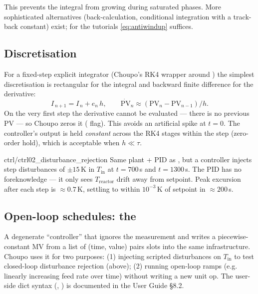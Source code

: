 \documentclass[11pt,a4paper]{article}
\begin{document}
This prevents the integral from growing during saturated phases.
More sophisticated alternatives (back-calculation, conditional
integration with a track-back constant) exist; for the tutorials \eqref{eq:antiwindup} suffices.

\subsection*{Discretisation}

For a fixed-step explicit integrator (Choupo's RK4 wrapper around
) the simplest discretisation is rectangular for
the integral and backward finite difference for the derivative:
\[
    I_{\,n+1} = I_{\,n} + e_n\,h,
    \qquad
    \dot{\mathrm{PV}}_n \approx (\mathrm{PV}_n - \mathrm{PV}_{n-1}) / h.
\]
On the very first step the derivative cannot be evaluated --- there
is no previous PV --- so Choupo zeros it ( flag).
This avoids an artificial spike at $t = 0$.  The controller's
output is held \emph{constant} across the RK4 stages within the
step (zero-order hold), which is acceptable when $h \ll \tau$.

\begin{tutoriallink}{ctrl/ctrl02\_disturbance\_rejection}
Same plant + PID as , but a  controller
injects step disturbances of $\pm 15$\,K in $T_{\mathrm{in}}$ at
$t = 700$\,s and $t = 1300$\,s.  The PID has no foreknowledge ---
it only sees $T_{\mathrm{reactor}}$ drift away from setpoint.  Peak
excursion after each step is $\approx 0.7$\,K, settling to within
$10^{-3}$\,K of setpoint in $\approx 200$\,s.
\end{tutoriallink}

\subsection*{Open-loop schedules: the }

A degenerate ``controller'' that ignores the measurement and
writes a piecewise-constant MV from a list of (time, value) pairs
slots into the same  infrastructure.  Choupo uses
it for two purposes: (1) injecting scripted disturbances on
$T_{\mathrm{in}}$ to test closed-loop disturbance rejection
(above); (2) running open-loop ramps (e.g. linearly increasing
feed rate over time) without writing a new unit op.  The user-side
dict syntax (, )
is documented in the User Guide §8.2.
\end{document}
